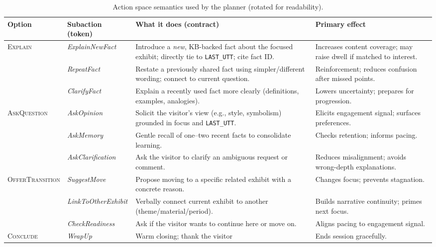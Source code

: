 \documentclass[12pt]{article}
\begin{document}
\begin{landscape}
\begin{table}[H]
\centering
\small
\begin{adjustbox}{max width=\linewidth}
\begin{tabularx}{\linewidth}{l l Y Y}
\toprule
\textbf{Option} & \textbf{Subaction (token)} & \textbf{What it does (contract)} & \textbf{Primary effect} \\
\midrule
\textsc{Explain} & \textit{ExplainNewFact} 
& Introduce a \emph{new}, KB-backed fact about the focused exhibit; directly tie to \texttt{LAST\_UTT}; cite fact ID. 
& Increases content coverage; may raise dwell if matched to interest. \\
& \textit{RepeatFact} 
& Restate a previously shared fact using simpler/different wording; connect to current question. 
& Reinforcement; reduces confusion after missed points. \\
& \textit{ClarifyFact} 
& Explain a recently used fact more clearly (definitions, examples, analogies). 
& Lowers uncertainty; prepares for progression. \\
\midrule
\textsc{AskQuestion} & \textit{AskOpinion} 
& Solicit the visitor’s view (e.g., style, symbolism) grounded in focus and \texttt{LAST\_UTT}. 
& Elicits engagement signal; surfaces preferences. \\
& \textit{AskMemory} 
& Gentle recall of one–two recent facts to consolidate learning. 
& Checks retention; informs pacing. \\
& \textit{AskClarification} 
& Ask the visitor to clarify an ambiguous request or comment. 
& Reduces misalignment; avoids wrong-depth explanations. \\
\midrule
\textsc{OfferTransition} & \textit{SuggestMove} 
& Propose moving to a specific related exhibit with a concrete reason. 
& Changes focus; prevents stagnation. \\
& \textit{LinkToOtherExhibit} 
& Verbally connect current exhibit to another (theme/material/period). 
& Builds narrative continuity; primes next focus. \\
& \textit{CheckReadiness} 
& Ask if the visitor wants to continue here or move on. 
& Aligns pacing to engagement signal. \\
\midrule
\textsc{Conclude} & \textit{WrapUp} 
& Warm closing; thank the visitor 
& Ends session gracefully. \\
\bottomrule
\end{tabularx}
\end{adjustbox}
\caption{Action space semantics used by the planner (rotated for readability).}
\label{tab:actions}
\end{table}
\end{landscape}
\end{document}
